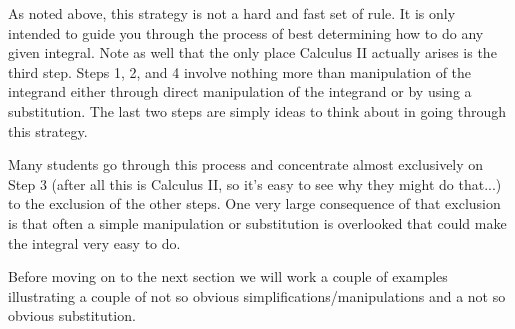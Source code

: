 As noted above, this strategy is not a hard and fast set of rule. It is only intended to guide you through the process of best determining how to do any given integral. Note as well that the only place Calculus II actually arises is the third step. Steps 1, 2, and 4 involve nothing more than manipulation of the integrand either through direct manipulation of the integrand or by using a substitution. The last two steps are simply ideas to think about in going through this strategy.

Many students go through this process and concentrate almost exclusively on Step 3 (after all this is Calculus II, so it's easy to see why they might do that...) to the exclusion of the other steps. One very large consequence of that exclusion is that often a simple manipulation or substitution is overlooked that could make the integral very easy to do.

Before moving on to the next section we will work a couple of examples illustrating a couple of not so obvious simplifications/manipulations and a not so obvious substitution.

